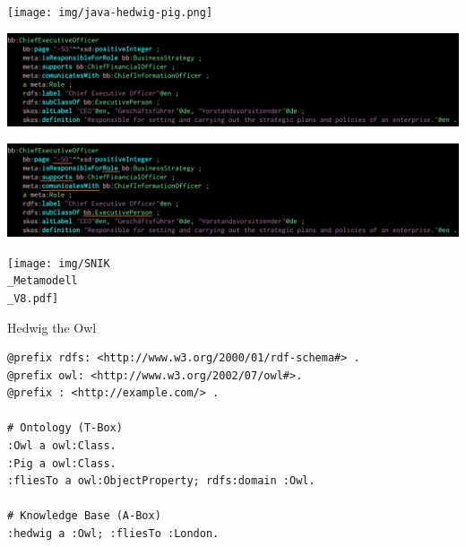 \documentclass[14pt,aspectratio=1610]{beamer}
\begin{document}
\begin{frame}{}
\centering\texttt{[image: img/java-hedwig-pig.png]}
\end{frame}

\begin{frame}{}
\centering\includegraphics[width=1.05\textwidth,height=1.05\textheight,keepaspectratio]{img/bb-ceo.png}
\end{frame}

\begin{frame}{}
\centering\includegraphics[width=1.05\textwidth,height=1.05\textheight,keepaspectratio]{img/bb-ceo-marked.png}
\end{frame}

\begin{frame}{}
\centering\texttt{[image: img/SNIK\\\_Metamodell\\\_V8.pdf]}
\end{frame}

%

\begin{frame}[fragile]{Hedwig the Owl}
\small
\begin{lstlisting}
@prefix rdfs: <http://www.w3.org/2000/01/rdf-schema#> .
@prefix owl: <http://www.w3.org/2002/07/owl#>.
@prefix : <http://example.com/> .

# Ontology (T-Box)
:Owl a owl:Class.
:Pig a owl:Class.
:fliesTo a owl:ObjectProperty; rdfs:domain :Owl.

# Knowledge Base (A-Box)
:hedwig a :Owl; :fliesTo :London.
\end{lstlisting}
\end{frame}
\end{document}
